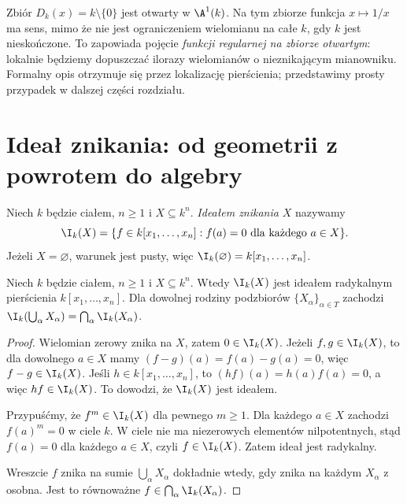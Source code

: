\begin{uwaga}
Zbiór $D_k(x)=k\setminus\{0\}$ jest otwarty w $\A^1(k)$.
Na tym zbiorze funkcja $x\mapsto1/x$ ma sens, mimo że nie jest
ograniczeniem wielomianu na całe $k$, gdy $k$ jest nieskończone.
To zapowiada pojęcie \emph{funkcji regularnej na zbiorze otwartym}:
lokalnie będziemy dopuszczać ilorazy wielomianów o nieznikającym
mianowniku. Formalny opis otrzymuje się przez lokalizację pierścienia;
przedstawimy prosty przypadek w dalszej części rozdziału.
\end{uwaga}

\section{Ideał znikania: od geometrii z powrotem do algebry}

\begin{definicja}
Niech $k$ będzie ciałem, $n\ge1$ i $X\subseteq k^n$.
\emph{Ideałem znikania} $X$ nazywamy
\[
\I_k(X)=\{f\in k[x_1,\dots,x_n]:f(a)=0\text{ dla każdego }a\in X\}.
\]
Jeżeli $X=\varnothing$, warunek jest pusty, więc
$\I_k(\varnothing)=k[x_1,\dots,x_n]$.
\end{definicja}

\begin{twierdzenie}
\label{tw:I-basic}
Niech $k$ będzie ciałem, $n\ge1$ i $X\subseteq k^n$.
Wtedy $\I_k(X)$ jest ideałem radykalnym pierścienia
$k[x_1,\dots,x_n]$. Dla dowolnej rodziny podzbiorów
$\{X_\alpha\}_{\alpha\in T}$ zachodzi
$\I_k(\bigcup_\alpha X_\alpha)=\bigcap_\alpha\I_k(X_\alpha)$.
\end{twierdzenie}
\begin{proof}
Wielomian zerowy znika na $X$, zatem $0\in\I_k(X)$.
Jeżeli $f,g\in\I_k(X)$, to dla dowolnego $a\in X$ mamy
$(f-g)(a)=f(a)-g(a)=0$, więc $f-g\in\I_k(X)$.
Jeśli $h\in k[x_1,\dots,x_n]$, to $(hf)(a)=h(a)f(a)=0$,
a więc $hf\in\I_k(X)$. To dowodzi, że $\I_k(X)$ jest ideałem.

Przypuśćmy, że $f^m\in\I_k(X)$ dla pewnego $m\ge1$.
Dla każdego $a\in X$ zachodzi $f(a)^m=0$ w ciele $k$.
W ciele nie ma niezerowych elementów nilpotentnych, stąd
$f(a)=0$ dla każdego $a\in X$, czyli $f\in\I_k(X)$.
Zatem ideał jest radykalny.

Wreszcie $f$ znika na sumie $\bigcup_\alpha X_\alpha$
dokładnie wtedy, gdy znika na każdym $X_\alpha$ z osobna.
Jest to równoważne $f\in\bigcap_\alpha\I_k(X_\alpha)$.
\end{proof}

